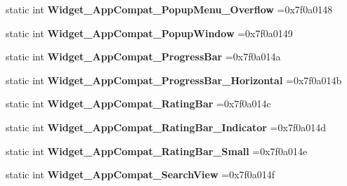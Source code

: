 \begin{DoxyCompactItemize}
static int {\bfseries Widget\+\_\+\+App\+Compat\+\_\+\+Popup\+Menu\+\_\+\+Overflow} =0x7f0a0148
\item 
\mbox{\label{classandroid_1_1support_1_1design_1_1R_1_1style_a1fc41367a136ce0d5787dfd936427f0a}} 
static int {\bfseries Widget\+\_\+\+App\+Compat\+\_\+\+Popup\+Window} =0x7f0a0149
\item 
\mbox{\label{classandroid_1_1support_1_1design_1_1R_1_1style_ac6680b72aef7717070c51f63d24e65e7}} 
static int {\bfseries Widget\+\_\+\+App\+Compat\+\_\+\+Progress\+Bar} =0x7f0a014a
\item 
\mbox{\label{classandroid_1_1support_1_1design_1_1R_1_1style_ab4c7c3873134e9f08f9c1972c2dfdb53}} 
static int {\bfseries Widget\+\_\+\+App\+Compat\+\_\+\+Progress\+Bar\+\_\+\+Horizontal} =0x7f0a014b
\item 
\mbox{\label{classandroid_1_1support_1_1design_1_1R_1_1style_a3b5064ddbe37ce748892fdbb602584a5}} 
static int {\bfseries Widget\+\_\+\+App\+Compat\+\_\+\+Rating\+Bar} =0x7f0a014c
\item 
\mbox{\label{classandroid_1_1support_1_1design_1_1R_1_1style_a20b760df497a3c7dc4d9df57d3aa1bf5}} 
static int {\bfseries Widget\+\_\+\+App\+Compat\+\_\+\+Rating\+Bar\+\_\+\+Indicator} =0x7f0a014d
\item 
\mbox{\label{classandroid_1_1support_1_1design_1_1R_1_1style_ab9f408cc6f546fd26bafeb514fe8c803}} 
static int {\bfseries Widget\+\_\+\+App\+Compat\+\_\+\+Rating\+Bar\+\_\+\+Small} =0x7f0a014e
\item 
\mbox{\label{classandroid_1_1support_1_1design_1_1R_1_1style_af31c32cc0d1a1de479c4ce94094f7fa9}} 
static int {\bfseries Widget\+\_\+\+App\+Compat\+\_\+\+Search\+View} =0x7f0a014f
\item 
\mbox{\label{classandroid_1_1support_1_1design_1_1R_1_1style_af9a56819b265df3791b2eebd04ba161b}} 

\end{DoxyCompactItemize}
